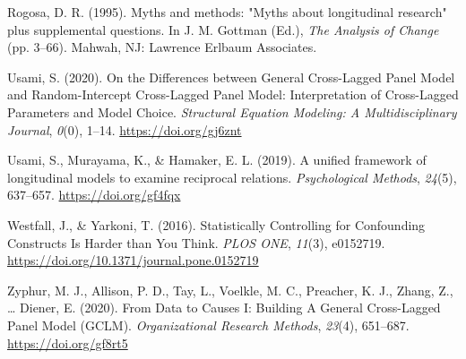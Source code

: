 \documentclass[
  english,
  man,floatsintext]{apa6}
\newlength{\cslhangindent}
\newlength{\cslentryspacingunit} %
\newenvironment{CSLReferences}[2] %
 {%
  \setlength{\parindent}{0pt}
  \ifodd #1
  \let\oldpar\par
  \def\par{\hangindent=\cslhangindent\oldpar}
  \fi
  \setlength{\parskip}{#2\cslentryspacingunit}
 }%
 {}
\begin{document}
\begin{CSLReferences}{1}{0}
\leavevmode{}%
Rogosa, D. R. (1995). Myths and methods: "{Myths} about longitudinal research" plus supplemental questions. In J. M. Gottman (Ed.), \emph{The {Analysis} of {Change}} (pp. 3--66). {Mahwah, NJ}: {Lawrence Erlbaum Associates}.

\leavevmode{}%
Usami, S. (2020). On the {Differences} between {General Cross-Lagged Panel Model} and {Random-Intercept Cross-Lagged Panel Model}: {Interpretation} of {Cross-Lagged Parameters} and {Model Choice}. \emph{Structural Equation Modeling: A Multidisciplinary Journal}, \emph{0}(0), 1--14. \url{https://doi.org/gj6znt}

\leavevmode{}%
Usami, S., Murayama, K., \& Hamaker, E. L. (2019). A unified framework of longitudinal models to examine reciprocal relations. \emph{Psychological Methods}, \emph{24}(5), 637--657. \url{https://doi.org/gf4fqx}

\leavevmode{}%
Westfall, J., \& Yarkoni, T. (2016). Statistically {Controlling} for {Confounding Constructs Is Harder} than {You Think}. \emph{PLOS ONE}, \emph{11}(3), e0152719. \url{https://doi.org/10.1371/journal.pone.0152719}

\leavevmode{}%
Zyphur, M. J., Allison, P. D., Tay, L., Voelkle, M. C., Preacher, K. J., Zhang, Z., \ldots{} Diener, E. (2020). From {Data} to {Causes I}: {Building A General Cross-Lagged Panel Model} ({GCLM}). \emph{Organizational Research Methods}, \emph{23}(4), 651--687. \url{https://doi.org/gf8rt5}

\end{CSLReferences}
\end{document}
